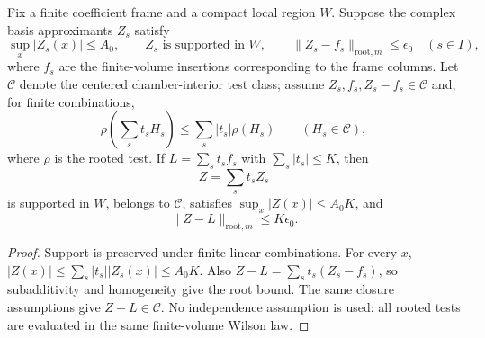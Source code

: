 \begin{lemma}
\label{lem:ex-public-origin-sum}
Fix a finite coefficient frame and a compact local region $W$. Suppose the
complex basis approximants $Z_s$ satisfy
\[
 \sup_x|Z_s(x)|\leq A_0,\qquad Z_s\text{ is supported in }W,
 \qquad \|Z_s-f_s\|_{\mathrm{root},m}\leq\epsilon_0
 \quad(s\in I),
\]
where $f_s$ are the finite-volume insertions corresponding to the frame
columns. Let $\mathcal C$ denote the centered chamber-interior test class;
assume $Z_s,f_s,Z_s-f_s\in\mathcal C$ and, for finite combinations,
\[
 \rho\!\left(\sum_s t_s H_s\right)
   \leq\sum_s|t_s|\rho(H_s)\qquad(H_s\in\mathcal C),
\]
where $\rho$ is the rooted test. If $L=\sum_s t_s f_s$ with
$\sum_s|t_s|\leq K$, then
\[
 Z=\sum_s t_s Z_s
\]
is supported in $W$, belongs to $\mathcal C$, satisfies
$\sup_x|Z(x)|\leq A_0K$, and
\[
                 \|Z-L\|_{\mathrm{root},m}\leq K\epsilon_0.
\]
\end{lemma}

\begin{proof}
Support is preserved under finite linear combinations. For every $x$,
$|Z(x)|\leq\sum_s|t_s||Z_s(x)|\leq A_0K$. Also
$Z-L=\sum_s t_s(Z_s-f_s)$, so subadditivity and homogeneity give the root
bound. The same closure assumptions give $Z-L\in\mathcal C$. No independence
assumption is used: all rooted tests are evaluated in the same finite-volume
Wilson law.
\end{proof}


